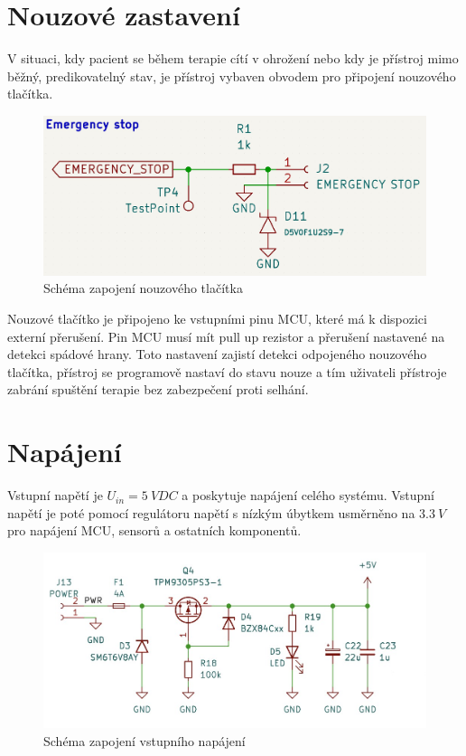 \section{Nouzové zastavení}
V situaci, kdy pacient se během terapie cítí v ohrožení nebo kdy je přístroj mimo běžný, predikovatelný stav, je přístroj vybaven obvodem pro připojení nouzového tlačítka.
\begin{figure}[H]
    \includegraphics[width=0.9\linewidth]{pictures/e_stop.jpg}
    \caption{Schéma zapojení nouzového tlačítka}
    \label{fig:e_stop}
\end{figure}
Nouzové tlačítko je připojeno ke vstupními pinu MCU, které má k dispozici externí přerušení. Pin MCU musí mít pull up rezistor a přerušení nastavené na detekci spádové hrany. Toto nastavení zajistí
detekci odpojeného nouzového tlačítka, přístroj se programově nastaví do stavu nouze a tím uživateli přístroje zabrání spuštění terapie bez zabezpečení proti selhání.
\section{Napájení}
Vstupní napětí je $U_{in} = 5 \ V DC$ a poskytuje napájení celého systému. Vstupní napětí je poté pomocí regulátoru napětí s nízkým úbytkem usměrněno na $3.3 \ V$ pro napájení MCU, sensorů a ostatních komponentů.

\begin{figure}[H]
    \includegraphics[width=0.9\linewidth]{pictures/power.jpg}
    \caption{Schéma zapojení vstupního napájení}
    \label{fig:power_input}
\end{figure}

